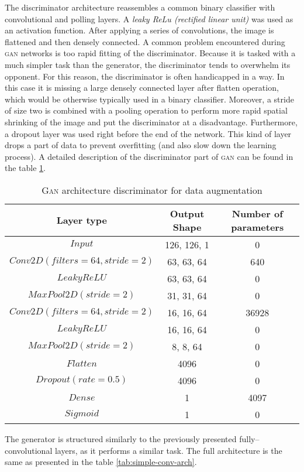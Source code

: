 The discriminator architecture reassembles a common binary classifier with convolutional and polling layers.
A \textit{leaky ReLu (rectified linear unit)} was used as an activation function.
After applying a series of convolutions, the image is flattened and then densely connected.
A common problem encountered during \textsc{gan} networks is too rapid fitting of the discriminator.
Because it is tasked with a much simpler task than the generator, the discriminator tends to overwhelm its opponent.
For this reason, the discriminator is often handicapped in a way.
In this case it is missing a large densely connected layer after flatten operation, which would be otherwise typically used in a binary classifier.
Moreover, a stride of size two is combined with a pooling operation to perform more rapid spatial shrinking of the image and put the discriminator at a disadvantage.
Furthermore, a dropout layer was used right before the end of the network.
This kind of layer drops a part of data to prevent overfitting (and also slow down the learning process).
A detailed description of the discriminator part of \textsc{gan} can be found in the table \ref{tab:discriminator-arch}.
\begin{table}
    \centering
    \caption{\textsc{Gan} architecture discriminator for data augmentation}
    \label{tab:discriminator-arch}
    \begin{tabular}{ccc}
        \toprule
        Layer type & Output Shape & Number of parameters \\
        \midrule
        $ Input $      & 126, 126, 1  & 0                    \\
        $ Conv2D(filters=64, stride=2) $ & 63, 63, 64 & 640 \\
        $ LeakyReLU $ & 63, 63, 64 & 0 \\
        $ MaxPool2D(stride=2) $ & 31, 31, 64 & 0 \\
        $ Conv2D(filters=64, stride=2) $ & 16, 16, 64 & 36928 \\
        $ LeakyReLU $ & 16, 16, 64 & 0 \\
        $ MaxPool2D(stride=2) $ & 8, 8, 64 & 0 \\
        $ Flatten $ & 4096 & 0 \\
        $ Dropout(rate=0.5) $ & 4096 & 0 \\
        $ Dense $ & 1 & 4097 \\
        $ Sigmoid $ & 1 & 0 \\
        \bottomrule
    \end{tabular}
\end{table}
The generator is structured similarly to the previously presented fully--convolutional layers, as it performs a similar task.
The full architecture is the same as presented in the table \ref{tab:simple-conv-arch}.
